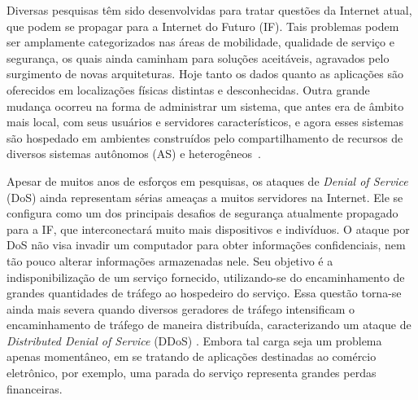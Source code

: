 
Diversas pesquisas têm sido desenvolvidas para tratar questões da Internet atual, que podem se propagar para a Internet do Futuro (IF). Tais problemas podem ser amplamente categorizados nas áreas de mobilidade, qualidade de serviço e segurança, os quais ainda caminham para soluções aceitáveis, agravados pelo surgimento de novas arquiteturas. Hoje tanto os dados quanto as aplicações são oferecidos em localizações físicas distintas e desconhecidas. Outra grande mudança ocorreu na forma de administrar um sistema, que antes era de âmbito mais local, com seus usuários e servidores característicos, e agora esses sistemas são hospedado em ambientes construídos pelo compartilhamento de recursos de diversos sistemas autônomos (AS) e heterogêneos~\cite{5486552}.


Apesar de muitos anos de esforços em pesquisas, os ataques de \emph{Denial of Service} (DoS) ainda representam sérias ameaças a muitos servidores na Internet.  Ele se configura como um dos principais desafios de segurança atualmente propagado para a IF, que interconectará muito mais dispositivos e indivíduos.  %
O ataque por DoS não visa invadir um computador para obter informações confidenciais, nem tão pouco alterar informações armazenadas nele. Seu objetivo é a indisponibilização de um serviço fornecido, utilizando-se do encaminhamento de grandes quantidades de tráfego ao hospedeiro do serviço. %
Essa questão torna-se ainda mais severa quando diversos geradores de tráfego intensificam o encaminhamento de tráfego de maneira distribuída, caracterizando um ataque de \emph{Distributed Denial of Service} (DDoS) \cite{Sachdeva08ddosincidents}. 
%
Embora tal carga seja um problema apenas momentâneo, em se tratando de aplicações destinadas ao comércio eletrônico, por exemplo, uma parada do serviço representa grandes perdas financeiras. 

